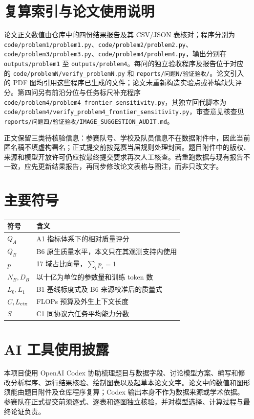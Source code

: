 \appendix
\section{复算索引与论文使用说明}
论文正文数值由仓库中的四份结果报告及其 CSV/JSON 表核对；程序分别为 \texttt{code/problem1/problem1.py}、\texttt{code/problem2/problem2.py}、\texttt{code/problem3/problem3.py}、\texttt{code/problem4/problem4.py}，输出分别在 \texttt{outputs/problem1} 至 \texttt{outputs/problem4}。每问的独立验收程序及报告位于对应的 \texttt{code/problemN/verify\_problemN.py} 和 \texttt{reports/问题N/验证验收/}。论文引入的 PDF 图均引用这些程序已生成的文件；论文未重新构造实验点或补填缺失评分。第四问另有前沿分位与任务标尺补充程序 \texttt{code/problem4/problem4\_frontier\_sensitivity.py}，其独立回代脚本为 \texttt{code/problem4/verify\_problem4\_frontier\_sensitivity.py}，审查意见核查见 \texttt{reports/问题四/验证验收/IMAGE\_SUGGESTION\_AUDIT.md}。

正文保留三类待核验信息：参赛队号、学校及队员信息不在数据附件中，因此当前匿名稿不填虚构署名；正式提交前按竞赛当届规则处理封面。题目附件中的版权、来源和模型开放许可仍应按最终提交要求再次人工核查。若重跑数据与现有报告不一致，应先更新结果报告，再同步修改论文表格与图注，而非只改文字。

\section{主要符号}
\begin{tabular}{p{2.1cm}p{10.5cm}}\toprule
符号 & 含义\\\midrule
$Q_A$ & A1 指标体系下的相对质量评分\\
$Q_B$ & B6 原生质量水平，本文只在其观测支持内使用\\
$p$ & 17 域占比向量，$\sum_i p_i=1$\\
$N_B,D_B$ & 以十亿为单位的参数量和训练 token 数\\
$L_0,L_1$ & B1 基线标度式及 B6 来源校准后的质量式\\
$C,L_{\rm ctx}$ & FLOPs 预算及外生上下文长度\\
$S$ & C1 同协议六任务平均能力分数\\\bottomrule
\end{tabular}

\section{AI 工具使用披露}
本项目使用 OpenAI Codex 协助梳理题目与数据字段、讨论模型方案、编写和修改分析程序、运行结果核验、绘制图表以及起草本论文文字。论文中的数值和图形须能由题目附件及仓库程序复算；Codex 输出本身不作为数据来源或学术依据。参赛队在正式提交前须逐式、逐表和逐图独立核验，并对模型选择、计算过程与最终论证负责。
